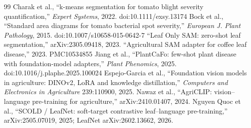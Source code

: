 \begin{thebibliography}{99}
 Charak et al., ``k-means segmentation for tomato blight severity quantification,'' \emph{Expert Systems}, 2022. doi:10.1111/exsy.13174
 Bock et al., ``Standard area diagrams for tomato bacterial spot severity,'' \emph{European J. Plant Pathology}, 2015. doi:10.1007/s10658-015-0642-7
 ``Leaf Only SAM: zero-shot leaf segmentation,'' arXiv:2305.09418, 2023.
 ``Agricultural SAM adapter for coffee leaf disease,'' 2023. PMC10534855
 Jiang et al., ``PlantCaFo: few-shot plant disease with foundation-model adapters,'' \emph{Plant Phenomics}, 2025. doi:10.1016/j.plaphe.2025.100024
 Espejo-Garcia et al., ``Foundation vision models in agriculture: DINOv2, LoRA and knowledge distillation,'' \emph{Computers and Electronics in Agriculture} 239:110900, 2025.
 Nawaz et al., ``AgriCLIP: vision--language pre-training for agriculture,'' arXiv:2410.01407, 2024.
 Nguyen Quoc et al., ``SCOLD / LeafNet: soft-target contrastive leaf--language pre-training,'' arXiv:2505.07019, 2025; LeafNet arXiv:2602.13662, 2026.


\end{thebibliography}
